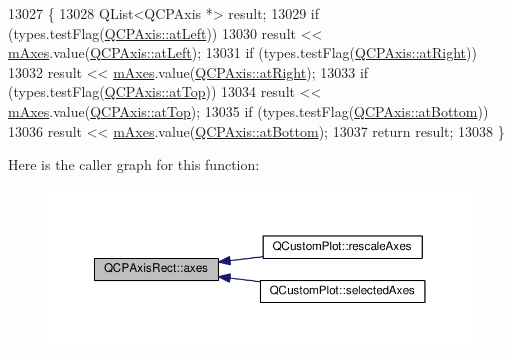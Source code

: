 \begin{DoxyCode}
13027                                                                \{
13028   QList<QCPAxis *> result;
13029   \textcolor{keywordflow}{if} (types.testFlag(\hyperlink{class_q_c_p_axis_ae2bcc1728b382f10f064612b368bc18aaf84aa6cac6fb6099f54a2cbf7546b730}{QCPAxis::atLeft}))
13030     result << \hyperlink{class_q_c_p_axis_rect_ac2cb3ba9a25b733883afc3bd25f7d82b}{mAxes}.value(\hyperlink{class_q_c_p_axis_ae2bcc1728b382f10f064612b368bc18aaf84aa6cac6fb6099f54a2cbf7546b730}{QCPAxis::atLeft});
13031   \textcolor{keywordflow}{if} (types.testFlag(\hyperlink{class_q_c_p_axis_ae2bcc1728b382f10f064612b368bc18aadf5509f7d29199ef2f263b1dd224b345}{QCPAxis::atRight}))
13032     result << \hyperlink{class_q_c_p_axis_rect_ac2cb3ba9a25b733883afc3bd25f7d82b}{mAxes}.value(\hyperlink{class_q_c_p_axis_ae2bcc1728b382f10f064612b368bc18aadf5509f7d29199ef2f263b1dd224b345}{QCPAxis::atRight});
13033   \textcolor{keywordflow}{if} (types.testFlag(\hyperlink{class_q_c_p_axis_ae2bcc1728b382f10f064612b368bc18aac0ece2b680d3f545e701f75af1655977}{QCPAxis::atTop}))
13034     result << \hyperlink{class_q_c_p_axis_rect_ac2cb3ba9a25b733883afc3bd25f7d82b}{mAxes}.value(\hyperlink{class_q_c_p_axis_ae2bcc1728b382f10f064612b368bc18aac0ece2b680d3f545e701f75af1655977}{QCPAxis::atTop});
13035   \textcolor{keywordflow}{if} (types.testFlag(\hyperlink{class_q_c_p_axis_ae2bcc1728b382f10f064612b368bc18aa220d68888516b6c3b493d144f1ba438f}{QCPAxis::atBottom}))
13036     result << \hyperlink{class_q_c_p_axis_rect_ac2cb3ba9a25b733883afc3bd25f7d82b}{mAxes}.value(\hyperlink{class_q_c_p_axis_ae2bcc1728b382f10f064612b368bc18aa220d68888516b6c3b493d144f1ba438f}{QCPAxis::atBottom});
13037   \textcolor{keywordflow}{return} result;
13038 \}
\end{DoxyCode}


Here is the caller graph for this function\+:\nopagebreak
\begin{figure}[H]
\begin{center}
\leavevmode
\includegraphics[width=350pt]{class_q_c_p_axis_rect_a66654d51ca611ef036ded36250cd2518_icgraph}
\end{center}
\end{figure}


